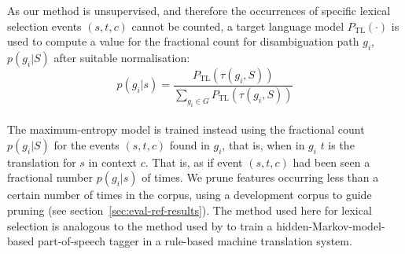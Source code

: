 \documentclass[11pt]{article}
\newcommand{\comment}[1]{\todo{#1}}
\begin{document}
As our method is unsupervised, and therefore the occurrences of
specific lexical selection events \((s,t,c)\) cannot be counted, a
target language model \(P_\mathrm{TL}(\cdot)\) is used to compute a value for
the fractional count for disambiguation path \(g_i\), $p(g_i|S)$ after
suitable normalisation:
\begin{equation}
 \label{eq:normalising}
   p(g_i|s) = \frac{P_\mathrm{TL}(\tau(g_i,S))}{\sum_{g_i \in G} P_\mathrm{TL}(\tau(g_i,S))}
\end{equation}
~\\
The maximum-entropy model is trained instead using the fractional count
$p(g_i|S)$ for the events $(s,t,c)$ found in \(g_i\), that is, when in
\(g_i\) $t$ is the translation for \(s\) in context \(c\). That is, as
if event $(s,t,c)$ had been seen a fractional number $p(g_i|s)$ of
times. We prune features  occurring less than a certain number of times 
in the corpus, using a development corpus to guide pruning (see section~\ref{sec:eval-ref-results}).
The method used here
for lexical selection is analogous to the method used by
\cite{sanchez08b} to train a hidden-Markov-model-based part-of-speech
tagger in a rule-based machine translation system. 
% 
\end{document}
